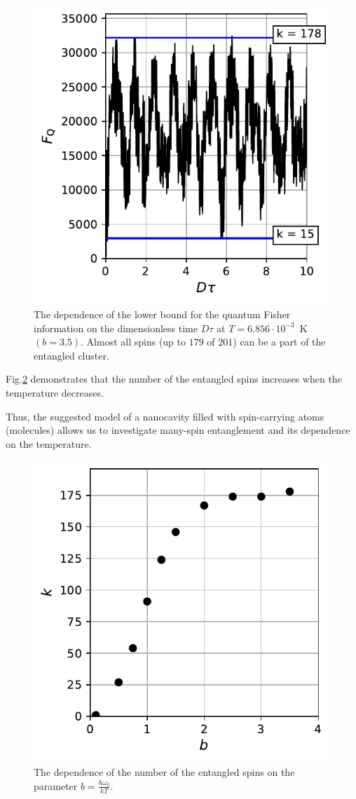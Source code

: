 \begin{figure}
    \centering
    \includegraphics{src/m2_t_b3_5.pdf}
    \caption{The dependence of the lower bound for the quantum Fisher information on the dimensionless time $D\tau$ at ${T=6.856\cdot10^{-3}}$~K $(b=3.5)$.
    Almost all spins (up to $179$ of $201$) can be a part of the entangled cluster.}
    \label{fig:m2_t_b3.5}
\end{figure}
\par 
Fig.\ref{fig:k_b} demonstrates that the number of the entangled spins increases when the temperature decreases.
\par
Thus, the suggested model of a nanocavity filled with spin-carrying atoms (molecules) allows us to investigate many-spin entanglement and its dependence on the temperature.
\begin{figure}
    \centering
    \includegraphics{src/k_b.pdf}
    \caption{The dependence of the number of the entangled spins on the parameter $b = \frac{\hbar\omega_0}{kT} $.}
    \label{fig:k_b}
\end{figure}
